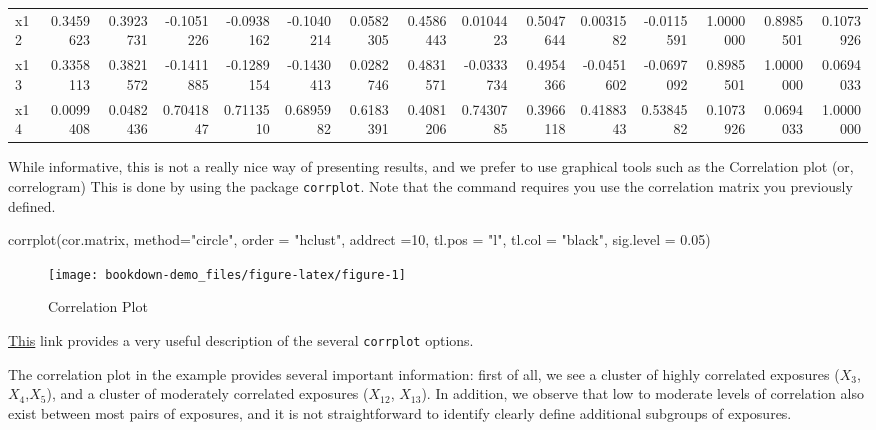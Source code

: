 \documentclass[
]{book}
\newenvironment{Shaded}{\begin{snugshade}}{\end{snugshade}}
\newcommand{\AttributeTok}[1]{\textcolor[rgb]{0.77,0.63,0.00}{#1}}
\newcommand{\DecValTok}[1]{\textcolor[rgb]{0.00,0.00,0.81}{#1}}
\newcommand{\FloatTok}[1]{\textcolor[rgb]{0.00,0.00,0.81}{#1}}
\newcommand{\FunctionTok}[1]{\textcolor[rgb]{0.00,0.00,0.00}{#1}}
\newcommand{\NormalTok}[1]{#1}
\newcommand{\StringTok}[1]{\textcolor[rgb]{0.31,0.60,0.02}{#1}}
\begin{document}
\begin{table}
\begin{tabular}[t]{lrrrrrrrrrrrrrr}
x12 & 0.3459623 & 0.3923731 & -0.1051226 & -0.0938162 & -0.1040214 & 0.0582305 & 0.4586443 & 0.0104423 & 0.5047644 & 0.0031582 & -0.0115591 & 1.0000000 & 0.8985501 & 0.1073926\\
x13 & 0.3358113 & 0.3821572 & -0.1411885 & -0.1289154 & -0.1430413 & 0.0282746 & 0.4831571 & -0.0333734 & 0.4954366 & -0.0451602 & -0.0697092 & 0.8985501 & 1.0000000 & 0.0694033\\
x14 & 0.0099408 & 0.0482436 & 0.7041847 & 0.7113510 & 0.6895982 & 0.6183391 & 0.4081206 & 0.7430785 & 0.3966118 & 0.4188343 & 0.5384582 & 0.1073926 & 0.0694033 & 1.0000000\\
\bottomrule
\end{tabular}
\end{table}

While informative, this is not a really nice way of presenting results, and we prefer to use graphical tools such as the Correlation plot (or, correlogram) This is done by using the package \texttt{corrplot}. Note that the command requires you use the correlation matrix you previously defined.

\begin{Shaded}
\begin{Highlighting}[]
\FunctionTok{corrplot}\NormalTok{(cor.matrix,}
         \AttributeTok{method=}\StringTok{"circle"}\NormalTok{,}
         \AttributeTok{order =} \StringTok{"hclust"}\NormalTok{,}
         \AttributeTok{addrect =}\DecValTok{10}\NormalTok{,}
         \AttributeTok{tl.pos =} \StringTok{"l"}\NormalTok{,}
         \AttributeTok{tl.col =} \StringTok{"black"}\NormalTok{,}
         \AttributeTok{sig.level =} \FloatTok{0.05}\NormalTok{)}
\end{Highlighting}
\end{Shaded}

\begin{figure}[H]

{\centering \texttt{[image: bookdown-demo\_files/figure-latex/figure-1]} 

}

\caption{Correlation Plot}\label{fig:figure}
\end{figure}

\href{https://cran.r-project.org/web/packages/corrplot/vignettes/corrplot-intro.html}{This} link provides a very useful description of the several \texttt{corrplot} options.

The correlation plot in the example provides several important information: first of all, we see a cluster of highly correlated exposures (\(X_3\),\(X_4\),\(X_5\)), and a cluster of moderately correlated exposures (\(X_{12}\), \(X_{13}\)). In addition, we observe that low to moderate levels of correlation also exist between most pairs of exposures, and it is not straightforward to identify clearly define additional subgroups of exposures.
\end{document}
